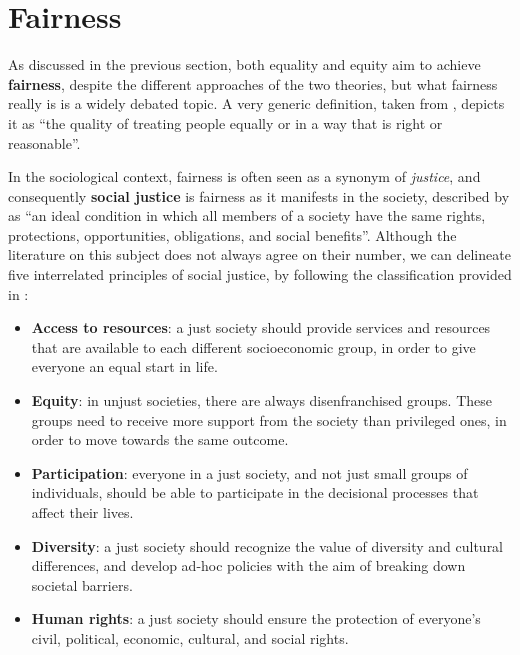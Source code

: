\section{Fairness}
As discussed in the previous section, both equality and equity aim to achieve \textbf{fairness}, despite the different approaches of the two theories, but what fairness really is is a widely debated topic. A very generic definition, taken from \cite{cambridge2013fairness}, depicts it as ``the quality of treating people equally or in a way that is right or reasonable''.

In the sociological context, fairness is often seen as a synonym of \textit{justice}, and consequently \textbf{social justice} is fairness as it manifests in the society, described by \cite[p.~405]{barker2003social} as ``an ideal condition in which all members of a society have the same rights, protections, opportunities, obligations, and social benefits''. Although the literature on this subject does not always agree on their number, we can delineate five interrelated principles of social justice, by following the classification provided in \cite{corporate2020social}:
\begin{itemize}
\item \textbf{Access to resources}: a just society should provide services and resources that are available to each different socioeconomic group, in order to give everyone an equal start in life.
\item \textbf{Equity}: in unjust societies, there are always disenfranchised groups. These groups need to receive more support from the society than privileged ones, in order to move towards the same outcome.
\item \textbf{Participation}: everyone in a just society, and not just small groups of individuals, should be able to participate in the decisional processes that affect their lives.
\item \textbf{Diversity}: a just society should recognize the value of diversity and cultural differences, and develop ad-hoc policies with the aim of breaking down societal barriers.
\item \textbf{Human rights}: a just society should ensure the protection of everyone's civil, political, economic, cultural, and social rights.
\end{itemize}

